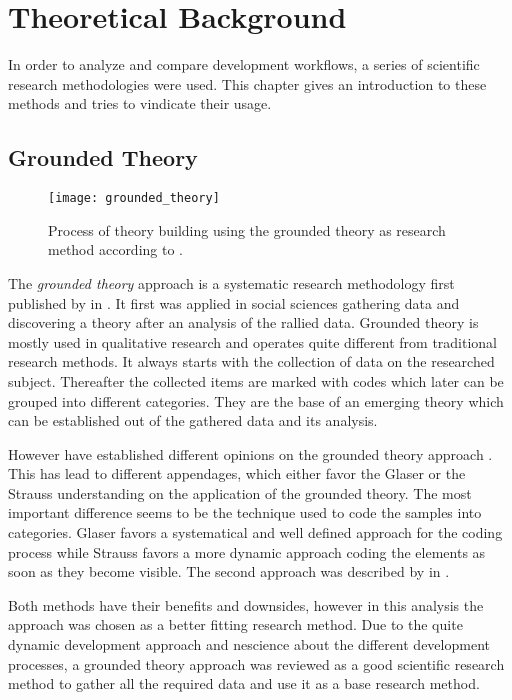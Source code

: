 \chapter{Theoretical Background} %
\label{chap:theoretical background}

In order to analyze and compare development workflows, a series of scientific
research methodologies were used. This chapter gives an introduction to these
methods and tries to vindicate their usage.

\section{Grounded Theory} %

\begin{figure}[htbp]
  \centering
  \texttt{[image: grounded\_theory]}
  \caption[Grounded Theory Process]
  {Process of theory building using the grounded theory as research method
    according to \citeauthor{Strauss1990} \cite{Pandit1996}.}
\end{figure}

The \emph{grounded theory} approach is a systematic research methodology first
published by \textcite{Glaser1967} in \citeyear{Glaser1967}. It first was
applied in social sciences gathering data and discovering a theory after an
analysis of the rallied data. Grounded theory is mostly used in qualitative
research and operates quite different from traditional research methods. It
always starts with the collection of data on the researched subject. Thereafter
the collected items are marked with codes which later can be grouped into
different categories. They are the base of an emerging theory which can be
established out of the gathered data and its analysis.

However \citeauthor{Glaser1967} have established different opinions on the
grounded theory approach \cite{Heath2004}. This has lead to different
appendages, which either favor the Glaser or the Strauss understanding on the
application of the grounded theory. The most important difference seems to be
the technique used to code the samples into categories. Glaser favors a
systematical and well defined approach for the coding process while Strauss
favors a more dynamic approach coding the elements as soon as they become
visible. The second approach was described by \textcite{Strauss1990} in
\citeyear{Strauss1990}.

Both methods have their benefits and downsides, however in this analysis the
\citeauthor{Strauss1990} approach was chosen as a better fitting research
method. Due to the quite dynamic development approach and nescience about the
different development processes, a grounded theory approach was reviewed as a
good scientific research method to gather all the required data and use it as a
base research method.

